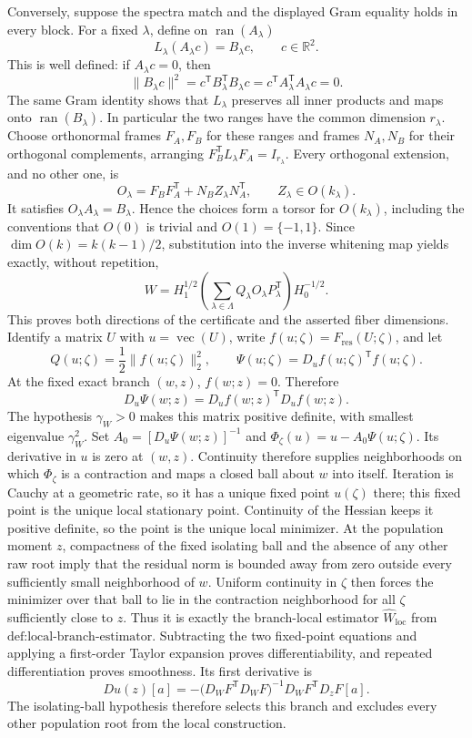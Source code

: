 Conversely, suppose the spectra match and the displayed Gram equality holds in every block.  For a fixed \(\lambda\), define on \(\operatorname{ran}(A_\lambda)\)
\[
 L_\lambda(A_\lambda c)=B_\lambda c,
 \qquad c\in\mathbb R^2.
\]
This is well defined: if \(A_\lambda c=0\), then
\[
 \lVert B_\lambda c\rVert^2
 =c^{\mathsf T}B_\lambda^{\mathsf T}B_\lambda c
 =c^{\mathsf T}A_\lambda^{\mathsf T}A_\lambda c=0.
\]
The same Gram identity shows that \(L_\lambda\) preserves all inner products and maps onto \(\operatorname{ran}(B_\lambda)\).  In particular the two ranges have the common dimension \(r_\lambda\).  Choose orthonormal frames \(F_A,F_B\) for these ranges and frames \(N_A,N_B\) for their orthogonal complements, arranging \(F_B^{\mathsf T}L_\lambda F_A=I_{r_\lambda}\).  Every orthogonal extension, and no other one, is
\[
 O_\lambda=F_BF_A^{\mathsf T}+N_B Z_\lambda N_A^{\mathsf T},
 \qquad Z_\lambda\in O(k_\lambda).
\]
It satisfies \(O_\lambda A_\lambda=B_\lambda\).  Hence the choices form a torsor for \(O(k_\lambda)\), including the conventions that \(O(0)\) is trivial and \(O(1)=\{-1,1\}\).  Since \(\dim O(k)=k(k-1)/2\), substitution into the inverse whitening map yields exactly, without repetition,
\[
 W=H_1^{1/2}\left(\sum_{\lambda\in\Lambda}Q_\lambda O_\lambda P_\lambda^{\mathsf T}\right)H_0^{-1/2}.
\]
This proves both directions of the certificate and the asserted fiber dimensions.
Identify a matrix \(U\) with \(u=\operatorname{vec}(U)\), write \(f(u;\zeta)=F_{\mathrm{res}}(U;\zeta)\), and let
\[
 Q(u;\zeta)=\frac12\lVert f(u;\zeta)\rVert_2^2,
 \qquad
 \Psi(u;\zeta)=D_uf(u;\zeta)^{\mathsf T}f(u;\zeta).
\]
At the fixed exact branch \((w,z)\), \(f(w;z)=0\).  Therefore
\[
 D_u\Psi(w;z)=D_uf(w;z)^{\mathsf T}D_uf(w;z).
\]
The hypothesis \(\gamma_W>0\) makes this matrix positive definite, with smallest eigenvalue \(\gamma_W^2\).  Set \(A_0=[D_u\Psi(w;z)]^{-1}\) and \(\Phi_\zeta(u)=u-A_0\Psi(u;\zeta)\).  Its derivative in \(u\) is zero at \((w,z)\).  Continuity therefore supplies neighborhoods on which \(\Phi_\zeta\) is a contraction and maps a closed ball about \(w\) into itself.  Iteration is Cauchy at a geometric rate, so it has a unique fixed point \(u(\zeta)\) there; this fixed point is the unique local stationary point.  Continuity of the Hessian keeps it positive definite, so the point is the unique local minimizer.  At the population moment \(z\), compactness of the fixed isolating ball and the absence of any other raw root imply that the residual norm is bounded away from zero outside every sufficiently small neighborhood of \(w\).  Uniform continuity in \(\zeta\) then forces the minimizer over that ball to lie in the contraction neighborhood for all \(\zeta\) sufficiently close to \(z\).  Thus it is exactly the branch-local estimator \(\widehat W_{\mathrm{loc}}\) from \(\text{def:local-branch-estimator}\).  Subtracting the two fixed-point equations and applying a first-order Taylor expansion proves differentiability, and repeated differentiation proves smoothness.  Its first derivative is
\[
 Du(z)[a]=-\bigl(D_WF^{\mathsf T}D_WF\bigr)^{-1}
 D_WF^{\mathsf T}D_zF[a].
\]
The isolating-ball hypothesis therefore selects this branch and excludes every other population root from the local construction.

